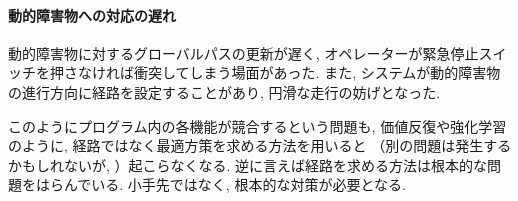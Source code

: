 \paragraph{動的障害物への対応の遅れ}
動的障害物に対するグローバルパスの更新が遅く, 
オペレーターが緊急停止スイッチを押さなければ衝突してしまう場面があった. 
また, システムが動的障害物の進行方向に経路を設定することがあり, 
円滑な走行の妨げとなった. 

このようにプログラム内の各機能が競合するという問題も, 
価値反復や強化学習のように, 
経路ではなく最適方策を求める方法を用いると
（別の問題は発生するかもしれないが, ）起こらなくなる. 
逆に言えば経路を求める方法は根本的な問題をはらんでいる. 
小手先ではなく, 根本的な対策が必要となる. 

